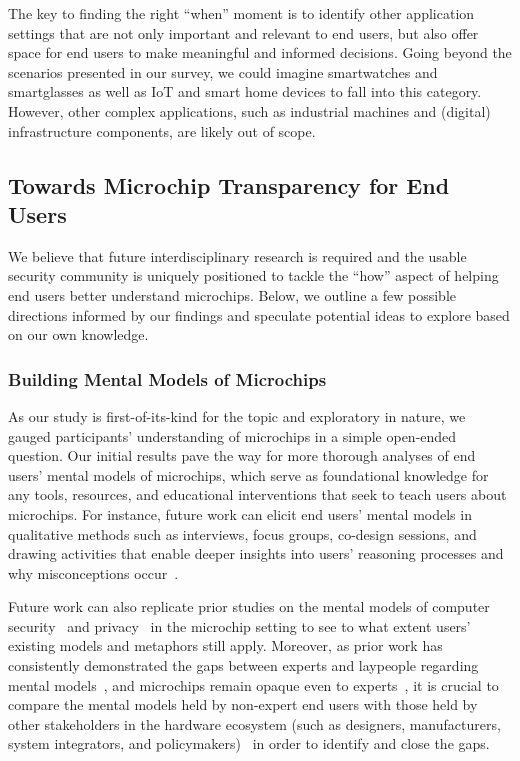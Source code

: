 The key to finding the right \enquote{when} moment is to identify other application settings that are not only important and relevant to end users, but also offer space for end users to make meaningful and informed decisions.
Going beyond the scenarios presented in our survey, we could imagine smartwatches and smartglasses as well as \acs{IoT} and smart home devices to fall into this category.
However, other complex applications, such as industrial machines and (digital) infrastructure components, are likely out of scope.


\subsection{Towards Microchip Transparency for End Users}
\label{sec:hci:implications}
We believe that future interdisciplinary research is required and the usable security community is uniquely positioned to tackle the \enquote{how} aspect of helping end users better understand microchips.
Below, we outline a few possible directions informed by our findings and speculate potential ideas to explore based on our own knowledge. 

\subsubsection{Building Mental Models of Microchips}
As our study is first-of-its-kind for the topic and exploratory in nature, we gauged participants' understanding of microchips in a simple open-ended question.
Our initial results pave the way for more thorough analyses of end users' mental models of microchips, which serve as foundational knowledge for any tools, resources, and educational interventions that seek to teach users about microchips.
For instance, future work can elicit end users' mental models in qualitative methods such as interviews, focus groups, co-design sessions, and drawing activities that enable deeper insights into users' reasoning processes and why misconceptions occur~\cite{jones2011mental}. 

Future work can also replicate prior studies on the mental models of computer security~\cite{wash2010folk,camp2009mental} and privacy~\cite{DBLP:journals/popets/OatesAMSZBC18} in the microchip setting to see to what extent users' existing models and metaphors still apply. 
Moreover, as prior work has consistently demonstrated the gaps between experts and laypeople regarding mental models~\cite{DBLP:journals/popets/OatesAMSZBC18,camp2007experimental,DBLP:conf/uss/BinkhorstFKPL22}, and microchips remain opaque even to experts~\cite{DBLP:conf/re/SpeithSBZBP24}, it is crucial to compare the mental models held by non-expert end users with those held by other stakeholders in the hardware ecosystem (such as designers, manufacturers, system integrators, and policymakers)~\cite{DBLP:conf/re/SpeithSBZBP24} in order to identify and close the gaps.


